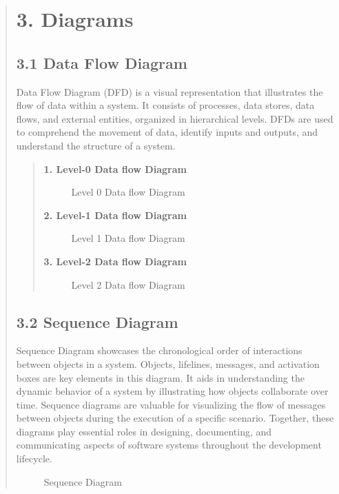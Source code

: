 \documentclass[12pt]{report}
\begin{document}
	
	\begin{quote}
		\section{3. Diagrams}
		
		\subsection{3.1 Data Flow Diagram}
		\hspace{1cm}Data Flow Diagram (DFD) is a visual representation that illustrates the flow of data within a system. It consists of processes, data stores, data flows, and external entities, organized in hierarchical levels. DFDs are used to comprehend the movement of data, identify inputs and outputs, and understand the structure of a system.\\
		
		\begin{quote}
			
			\textbf{1. Level-0 Data flow Diagram}
			\begin{figure}
				\centering
				\caption{Level 0 Data flow Diagram}
			\end{figure}
			
			
			\textbf{2. Level-1 Data flow Diagram}
			\begin{figure}
				\centering
				\caption{Level 1 Data flow Diagram}
			\end{figure}
			\clearpage
			\textbf{3. Level-2 Data flow Diagram}
			\begin{figure}
				\centering
				\caption{Level 2 Data flow Diagram}
			\end{figure}
		\end{quote}
		\subsection{3.2 Sequence Diagram}
		\hspace{1cm}Sequence Diagram showcases the chronological order of interactions between objects in a system. Objects, lifelines, messages, and activation boxes are key elements in this diagram. It aids in understanding the dynamic behavior of a system by illustrating how objects collaborate over time. Sequence diagrams are valuable for visualizing the flow of messages between objects during the execution of a specific scenario. Together, these diagrams play essential roles in designing, documenting, and communicating aspects of software systems throughout the development lifecycle.
		\begin{figure}
			\centering
			\caption{Sequence Diagram}
		\end{figure}

\end{quote}
\end{document}
